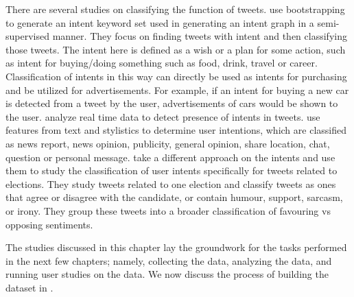 There are several studies on classifying the function of tweets. \cite{wang2015mining} use bootstrapping to generate an intent keyword set used in generating an intent graph in a semi-supervised manner. They focus on finding tweets with intent and then classifying those tweets. The intent here is defined as a wish or a plan for some action, such as intent for buying/doing something such as food, drink, travel or career. Classification of intents in this way can directly be used as intents for purchasing and be utilized for advertisements. For example, if an intent for buying a new car is detected from a tweet by the user, advertisements of cars would be shown to the user. \citet{banerjee2012towards} analyze real time data to detect presence of intents in tweets. \citet{gomez2014content} use features from text and stylistics to determine user intentions, which are classified as news report, news opinion, publicity, general opinion, share location, chat, question or personal message. \cite{mohammad2013identifying} take a different approach on the intents and use them to study the classification of user intents specifically for tweets related to elections. They study tweets related to one election and classify tweets as ones that agree or disagree with the candidate,  or contain humour, support, sarcasm, or irony. They group these tweets into a broader classification of favouring vs opposing sentiments.


The studies discussed in this chapter lay the groundwork for the tasks performed in the next few chapters; namely, collecting the data, analyzing the data, and running user studies on the data. We now discuss the process of building the dataset in .